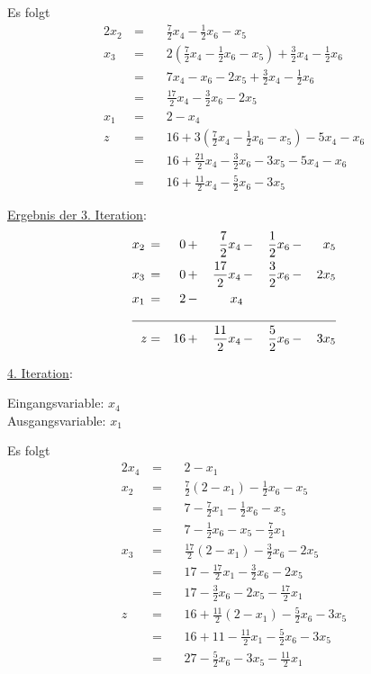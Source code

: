 \documentclass[10pt,a4paper,oneside,ngerman,numbers=noenddot]{scrartcl}
\begin{document}
		Es folgt
		\begin{alignat*}{2}
			x_{2} \,&=&&\, \frac{7}{2}x_{4} - \frac{1}{2}x_{6} - x_{5} \\
			x_{3} \,&=&&\, 2\left(\frac{7}{2}x_{4} - \frac{1}{2}x_{6} - x_{5}\right) + \frac{3}{2}x_{4} - \frac{1}{2}x_{6} \\
			&=&&\, 7x_{4} - x_{6} - 2x_{5} + \frac{3}{2}x_{4} - \frac{1}{2}x_{6} \\
			&=&&\, \frac{17}{2}x_{4} - \frac{3}{2}x_{6} - 2x_{5} \\
			x_{1} \,&=&&\, 2 - x_{4} \\
			z \,&=&&\, 16 + 3\left(\frac{7}{2}x_{4} - \frac{1}{2}x_{6} - x_{5}\right) - 5x_{4} - x_{6}  \\
			&=&&\, 16 + \frac{21}{2}x_{4} - \frac{3}{2}x_{6} - 3x_{5} - 5x_{4} - x_{6} \\
			&=&&\, 16 + \frac{11}{2}x_{4} - \frac{5}{2}x_{6} - 3x_{5} 
		\end{alignat*}
		
		\underline{Ergebnis der 3. Iteration}:
		\begin{alignat*}{5}
			x_{2} \,&=&\, 0 \,&+&\, \frac{7}{2}x_{4} \,&-&\, \frac{1}{2}x_{6} \,&-&\, x_{5} \\
			x_{3} \,&=&\, 0 \,&+&\, \frac{17}{2}x_{4} \,&-&\, \frac{3}{2}x_{6} \,&-&\, 2x_{5} \\
			x_{1} \,&=&\, 2 \,&-&\, x_{4} && && \\ \cline{1 - 9}
			z &=& 16 \,&+&\, \frac{11}{2}x_{4} \,&-&\, \frac{5}{2}x_{6} \,&-&\, 3x_{5}
		\end{alignat*}
		
		\underline{4. Iteration}:
		
		Eingangsvariable: $x_{4}$ \\
		Ausgangsvariable: $x_{1}$
		
		Es folgt
		\begin{alignat*}{2}
			x_{4} \,&=&&\, 2 - x_{1} \\
			x_{2} \,&=&&\, \frac{7}{2}\left(2 - x_{1}\right) - \frac{1}{2}x_{6} - x_{5} \\
			&=&&\, 7 - \frac{7}{2}x_{1} - \frac{1}{2}x_{6} - x_{5} \\
			&=&&\, 7 - \frac{1}{2}x_{6} - x_{5} - \frac{7}{2}x_{1} \\
			x_{3} \,&=&&\, \frac{17}{2}\left(2 - x_{1}\right) - \frac{3}{2}x_{6} - 2x_{5} \\
			&=&&\, 17 - \frac{17}{2}x_{1} - \frac{3}{2}x_{6} - 2x_{5} \\
			&=&&\, 17 - \frac{3}{2}x_{6} - 2x_{5} - \frac{17}{2}x_{1} \\
			z \,&=&&\, 16 + \frac{11}{2}\left(2 - x_{1}\right) - \frac{5}{2}x_{6} - 3x_{5}  \\
			&=&&\, 16 + 11 - \frac{11}{2}x_{1} - \frac{5}{2}x_{6} - 3x_{5} \\
			&=&&\, 27 - \frac{5}{2}x_{6} - 3x_{5}  - \frac{11}{2}x_{1}
		\end{alignat*}
		
\end{document}
